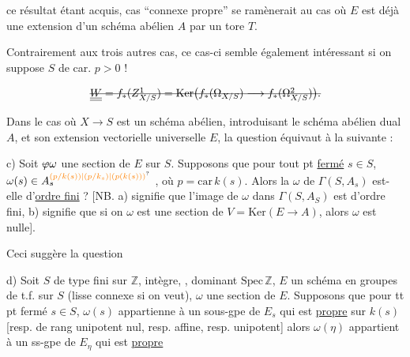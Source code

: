  ce résultat étant acquis,   cas ``connexe propre'' se ramènerait au cas où $E$ est déjà une extension d'un schéma abélien $A$ par un tore $T$.

 Contrairement aux trois autres cas, ce cas-ci semble également intéressant si on suppose $S$ de car. $p>0$  !



\[
\deleted{\underline{\underline{W}}=f_*(Z^1_{X/S})=\operatorname{Ker}\bigl(f_*(\Omega_{X/S})\longrightarrow f_*(\Omega^2_{X/S})\bigr).}
\]

Dans le cas où $X\to S$ est un schéma abélien, introduisant le schéma abélien dual $A$, et son extension vectorielle universelle $E$, la question  équivaut à la suivante : 



c) Soit $\deleted{\varphi}\omega$ une section de $E$ sur $S$. Supposons que pour tout pt \uline{fermé} $s\in S$, $\omega(s)\in A_s^{\unsure{(p/k(s))|(p/k_s)|(p(k(s)))}}$ , où $p=\mathrm{car}\,k(s)$. Alors la  $\omega$ de $\Gamma(S,A_s)$ est-elle d'\uline{ordre fini} ? [NB. a) signifie que l'image de $\omega$ dans $\Gamma(S,A_S)$ est d'ordre fini, b) signifie que si on  $\omega$ est une section de $V=\mathrm{Ker}(E\to A)$, alors $\omega$ est nulle].

Ceci suggère la question

d) Soit $S$ de type fini sur $\mathbb Z$, intègre, , dominant $\mathrm{Spec}\,\mathbb Z$,  $E$ un schéma en groupes  de t.f. sur $S$ (lisse connexe si on veut\unsure{ !|}), $\omega$ une section de $E$. Supposons que pour tt pt fermé $s\in S$, $\omega(s)$ appartienne  à un sous-gpe de $E_s$ qui est \uline{propre}  sur $k(s)$ [resp.  de rang unipotent nul, resp.  affine, resp.  unipotent] alors $\omega(\eta)$ appartient à un ss-gpe de $E_\eta$ qui est \uline{propre}

